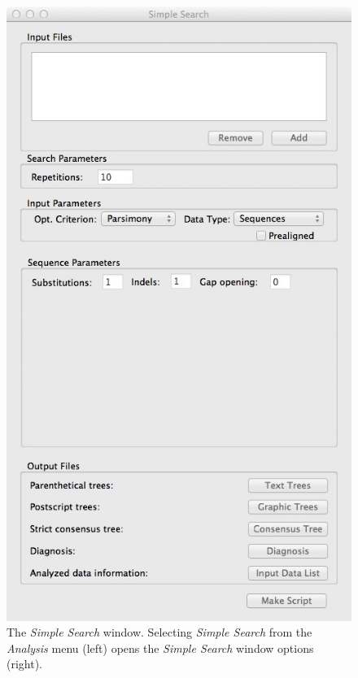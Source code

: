 \begin{figure}
\begin{minipage}[c]{0.52\textwidth}
	   	\includegraphics[width=\textwidth]{doc/figures/simplesearch_window.jpg}
   	\end{minipage}
	
\caption{The \emph{Simple Search} window. Selecting \emph{Simple Search} from the \emph{Analysis} 
menu (left) opens the \emph{Simple Search} window options (right).}
\label{fig:simple_search_window}
\end{figure}

